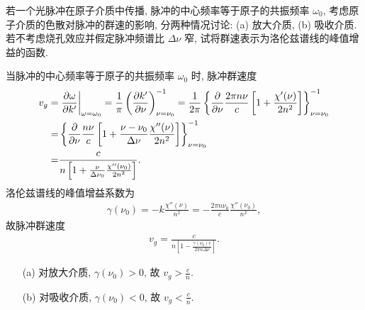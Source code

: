 \documentclass[twoside]{note}
\begin{document}
\begin{exe}
    若一个光脉冲在原子介质中传播, 脉冲的中心频率等于原子的共振频率 $\omega_0$, 考虑原子介质的色散对脉冲的群速的影响, 分两种情况讨论: (a) 放大介质, (b) 吸收介质. 若不考虑烧孔效应并假定脉冲频谱比 $\Delta\nu$ 窄, 试将群速表示为洛伦兹谱线的峰值增益的函数.
\end{exe}
\begin{sol}
    当脉冲的中心频率等于原子的共振频率 $\omega_0$ 时, 脉冲群速度
    \begin{align}
        \notag v_g=&\left.\frac{\partial\omega}{\partial k'}\right|_{\omega=\omega_0}=\frac{1}{\pi}\left(\frac{\partial k'}{\partial\nu}\right)^{-1}_{\nu=\nu_0}=\frac{1}{2\pi}\left\{\frac{\partial}{\partial\nu}\frac{2\pi n\nu}{c}\left[1+\frac{\chi'(\nu)}{2n^2}\right]\right\}^{-1}_{\nu=\nu_0}\\
        \notag=&\left\{\frac{\partial}{\partial\nu}\frac{n\nu}{c}\left[1+\frac{\nu-\nu_0}{\Delta\nu}\frac{\chi''(\nu)}{2n^2}\right]\right\}^{-1}_{\nu=\nu_0}\\
        =&\frac{c}{n\left[1+\frac{\nu}{\Delta\nu_0}\frac{\chi''(\nu_0)}{2n^2}\right]}.
    \end{align}
    洛伦兹谱线的峰值增益系数为
    \begin{align}
        \gamma(\nu_0)=-k\frac{\chi''(\nu)}{n^2}=-\frac{2\pi n\nu_0}{c}\frac{\chi''(\nu_0)}{n^2},
    \end{align}
    故脉冲群速度
    \begin{align}
        v_g=\frac{c}{n\left[1-\frac{\gamma(\nu_0)c}{2\pi n\Delta\nu}\right]}.
    \end{align}
    \begin{itemize}
        \item[(a)] 对放大介质, $\gamma(\nu_0)>0$, 故 $v_g>\frac{c}{n}$.
        \item[(b)] 对吸收介质, $\gamma(\nu_0)<0$, 故 $v_g<\frac{c}{n}$.
    \end{itemize}
\end{sol}
\end{document}
